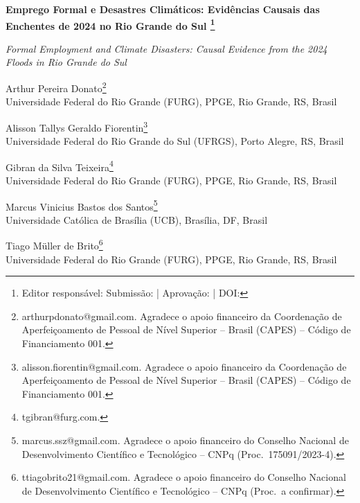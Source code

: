 \documentclass[a4paper,12pt]{article}
\begin{document}
\thispagestyle{titlepage}

\begin{center}

  {\large\bfseries Emprego Formal e Desastres Climáticos: Evidências
    Causais das Enchentes de 2024 no Rio Grande do Sul%
    \footnote{Editor responsável: \quad Submissão: \quad | \quad Aprovação: \quad | \quad DOI:}}

  \vspace{0.6em}

  {\normalsize\itshape Formal Employment and Climate Disasters: Causal Evidence
    from the 2024 Floods in Rio Grande do Sul}

  \vspace{1.2em}

  {\normalsize Arthur Pereira Donato\footnote{arthurpdonato@gmail.com.
    Agradece o apoio financeiro da Coordenação de Aperfeiçoamento de Pessoal de
    Nível Superior -- Brasil (CAPES) -- Código de Financiamento 001.}}\\
  {\small Universidade Federal do Rio Grande (FURG), PPGE, Rio Grande, RS, Brasil}

  \vspace{0.5em}

  {\normalsize Alisson Tallys Geraldo Fiorentin\footnote{alisson.fiorentin@gmail.com.
    Agradece o apoio financeiro da Coordenação de Aperfeiçoamento de Pessoal de
    Nível Superior -- Brasil (CAPES) -- Código de Financiamento 001.}}\\
  {\small Universidade Federal do Rio Grande do Sul (UFRGS), Porto Alegre, RS, Brasil}

  \vspace{0.5em}

  {\normalsize Gibran da Silva Teixeira\footnote{tgibran@furg.com.}}\\
  {\small Universidade Federal do Rio Grande (FURG), PPGE, Rio Grande, RS, Brasil}

  \vspace{0.5em}

  {\normalsize Marcus Vinicius Bastos dos Santos\footnote{marcus.ssz@gmail.com.
    Agradece o apoio financeiro do Conselho Nacional de Desenvolvimento
    Científico e Tecnológico -- CNPq (Proc.\ 175091/2023-4).}}\\
  {\small Universidade Católica de Brasília (UCB), Brasília, DF, Brasil}

  \vspace{0.5em}

  {\normalsize Tiago Müller de Brito\footnote{ttiagobrito21@gmail.com.
    Agradece o apoio financeiro do Conselho Nacional de Desenvolvimento
    Científico e Tecnológico -- CNPq (Proc.\ a confirmar).}}\\
  {\small Universidade Federal do Rio Grande (FURG), PPGE, Rio Grande, RS, Brasil}

\end{center}
\end{document}
